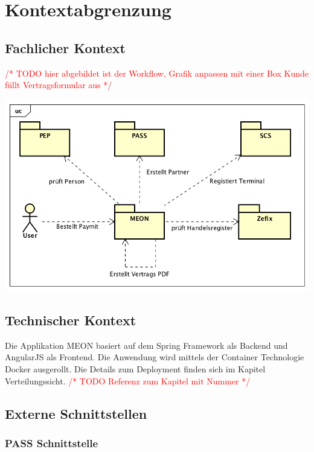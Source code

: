 \graphicspath{{./images/}}

\chapter{Kontextabgrenzung}

\section{Fachlicher Kontext}
\textcolor{red}{/* TODO hier abgebildet ist der Workflow, Grafik anpassen mit einer Box Kunde füllt Vertragsformular aus */}
\begin{center}
	\includegraphics[scale=0.7]{kontext.png}
\end{center}


\section{Technischer Kontext}

Die Applikation MEON basiert auf dem Spring Framework als Backend und AngularJS als Frontend. Die Anwendung wird mittels der Container Technologie Docker ausgerollt. Die Details zum Deployment finden sich im Kapitel Verteilungssicht. \textcolor{red}{/* TODO Referenz zum Kapitel mit Nummer */}

\section{Externe Schnittstellen}

\subsection{PASS Schnittstelle}
		
